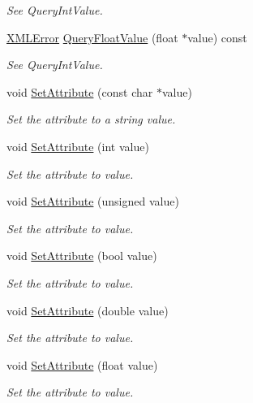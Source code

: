 \begin{DoxyCompactItemize}
\begin{DoxyCompactList}\small\item\em See Query\+Int\+Value. \end{DoxyCompactList}\item 
\hyperlink{namespacetinyxml2_a1fbf88509c3ac88c09117b1947414e08}{X\+M\+L\+Error} \hyperlink{classtinyxml2_1_1_x_m_l_attribute_afb254627c296d1d70b755397d32fece8}{Query\+Float\+Value} (float $\ast$value) const 
\begin{DoxyCompactList}\small\item\em See Query\+Int\+Value. \end{DoxyCompactList}\item 
void \hyperlink{classtinyxml2_1_1_x_m_l_attribute_a406d2c4a13c7af99a65edb59dd9f7581}{Set\+Attribute} (const char $\ast$value)
\begin{DoxyCompactList}\small\item\em Set the attribute to a string value. \end{DoxyCompactList}\item 
void \hyperlink{classtinyxml2_1_1_x_m_l_attribute_ad86d7d7058d76761c3a80662566a57e5}{Set\+Attribute} (int value)
\begin{DoxyCompactList}\small\item\em Set the attribute to value. \end{DoxyCompactList}\item 
void \hyperlink{classtinyxml2_1_1_x_m_l_attribute_ae70468c0f6df2748ba3529c716999fae}{Set\+Attribute} (unsigned value)
\begin{DoxyCompactList}\small\item\em Set the attribute to value. \end{DoxyCompactList}\item 
void \hyperlink{classtinyxml2_1_1_x_m_l_attribute_ab3516def4fe058fe328f2b89fc2d77da}{Set\+Attribute} (bool value)
\begin{DoxyCompactList}\small\item\em Set the attribute to value. \end{DoxyCompactList}\item 
void \hyperlink{classtinyxml2_1_1_x_m_l_attribute_a9a65ab3147abe8ccbbd373ce8791e818}{Set\+Attribute} (double value)
\begin{DoxyCompactList}\small\item\em Set the attribute to value. \end{DoxyCompactList}\item 
void \hyperlink{classtinyxml2_1_1_x_m_l_attribute_ae95e843313aaf5d56c32530b6456df02}{Set\+Attribute} (float value)
\begin{DoxyCompactList}\small\item\em Set the attribute to value. \end{DoxyCompactList}\end{DoxyCompactItemize}
